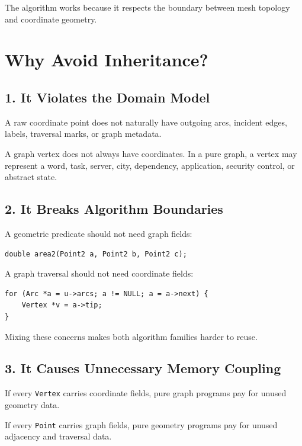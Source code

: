 \documentclass[11pt]{article}
\begin{document}
The algorithm works because it respects the boundary between mesh topology and coordinate geometry.

\section{Why Avoid Inheritance?}

\subsection{1. It Violates the Domain Model}

A raw coordinate point does not naturally have outgoing arcs, incident edges, labels, traversal marks, or graph metadata.

A graph vertex does not always have coordinates. In a pure graph, a vertex may represent a word, task, server, city, dependency, application, security control, or abstract state.

\subsection{2. It Breaks Algorithm Boundaries}

A geometric predicate should not need graph fields:

\begin{verbatim}
double area2(Point2 a, Point2 b, Point2 c);
\end{verbatim}

A graph traversal should not need coordinate fields:

\begin{verbatim}
for (Arc *a = u->arcs; a != NULL; a = a->next) {
    Vertex *v = a->tip;
}
\end{verbatim}

Mixing these concerns makes both algorithm families harder to reuse.

\subsection{3. It Causes Unnecessary Memory Coupling}

If every \texttt{Vertex} carries coordinate fields, pure graph programs pay for unused geometry data.

If every \texttt{Point} carries graph fields, pure geometry programs pay for unused adjacency and traversal data.
\end{document}
